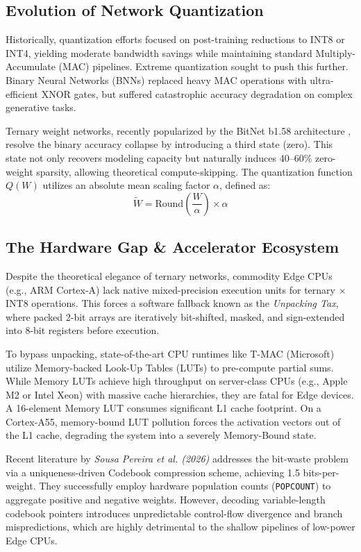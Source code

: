 \documentclass[10pt, conference]{IEEEtran}
\begin{document}
\subsection{Evolution of Network Quantization}
Historically, quantization efforts focused on post-training reductions to INT8 or INT4, yielding moderate bandwidth savings while maintaining standard Multiply-Accumulate (MAC) pipelines. Extreme quantization sought to push this further. Binary Neural Networks (BNNs) replaced heavy MAC operations with ultra-efficient XNOR gates, but suffered catastrophic accuracy degradation on complex generative tasks. 

Ternary weight networks, recently popularized by the BitNet b1.58 architecture \cite{ma_era_2024}, resolve the binary accuracy collapse by introducing a third state (zero). This state not only recovers modeling capacity but naturally induces 40--60\% zero-weight sparsity, allowing theoretical compute-skipping. 
The quantization function $Q(W)$ utilizes an absolute mean scaling factor $\alpha$, defined as:
\begin{equation}
\tilde{W} = \text{Round}\left( \frac{W}{\alpha} \right) \times \alpha
\end{equation}

\subsection{The Hardware Gap \& Accelerator Ecosystem}
Despite the theoretical elegance of ternary networks, commodity Edge CPUs (e.g., ARM Cortex-A) lack native mixed-precision execution units for ternary $\times$ INT8 operations. This forces a software fallback known as the \textit{Unpacking Tax}, where packed 2-bit arrays are iteratively bit-shifted, masked, and sign-extended into 8-bit registers before execution. 

To bypass unpacking, state-of-the-art CPU runtimes like T-MAC (Microsoft) \cite{wei_t-mac_2025} utilize Memory-backed Look-Up Tables (LUTs) to pre-compute partial sums. While Memory LUTs achieve high throughput on server-class CPUs (e.g., Apple M2 or Intel Xeon) with massive cache hierarchies, they are fatal for Edge devices. A 16-element Memory LUT consumes significant L1 cache footprint. On a Cortex-A55, memory-bound LUT pollution forces the activation vectors out of the L1 cache, degrading the system into a severely Memory-Bound state.

Recent literature by \textit{Sousa Pereira et al. (2026)} \cite{sousa_pereira_codebook-based_2026} addresses the bit-waste problem via a uniqueness-driven Codebook compression scheme, achieving 1.5 bits-per-weight. They successfully employ hardware population counts (\texttt{POPCOUNT}) to aggregate positive and negative weights. However, decoding variable-length codebook pointers introduces unpredictable control-flow divergence and branch mispredictions, which are highly detrimental to the shallow pipelines of low-power Edge CPUs. 
\end{document}
